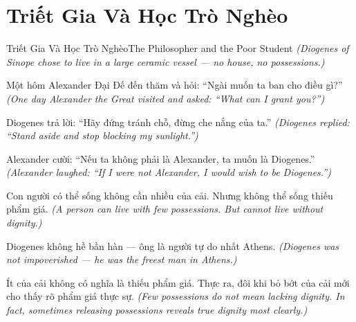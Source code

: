 \section{Triết Gia Và Học Trò Nghèo}
\begin{truyen}{Triết Gia Và Học Trò Nghèo}{The Philosopher and the Poor Student}
\textit{(Diogenes of Sinope chose to live in a large ceramic vessel — no house, no possessions.)}

Một hôm Alexander Đại Đế đến thăm và hỏi: ``Ngài muốn ta ban cho điều gì?''
\textit{(One day Alexander the Great visited and asked: ``What can I grant you?'')}

Diogenes trả lời: ``Hãy đứng tránh chỗ, đừng che nắng của ta.''
\textit{(Diogenes replied: ``Stand aside and stop blocking my sunlight.'')}

Alexander cười: ``Nếu ta không phải là Alexander, ta muốn là Diogenes.''
\textit{(Alexander laughed: ``If I were not Alexander, I would wish to be Diogenes.'')}

Con người có thể sống không cần nhiều của cải. Nhưng không thể sống thiếu phẩm giá.
\textit{(A person can live with few possessions. But cannot live without dignity.)}

Diogenes không hề bần hàn — ông là người tự do nhất Athens.
\textit{(Diogenes was not impoverished — he was the freest man in Athens.)}

\end{truyen}

\begin{baihoc}
Ít của cải không có nghĩa là thiếu phẩm giá. Thực ra, đôi khi bỏ bớt của cải mới cho thấy rõ phẩm giá thực sự.
\textit{(Few possessions do not mean lacking dignity. In fact, sometimes releasing possessions reveals true dignity most clearly.)}
\end{baihoc}
\ngancach

